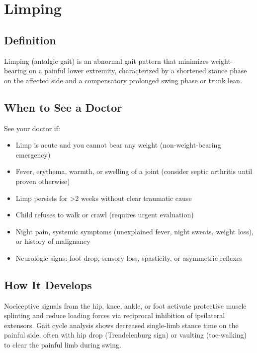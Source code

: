 \chapter{Limping}

\section*{Definition}
Limping (antalgic gait) is an abnormal gait pattern that minimizes weight-bearing on a painful lower extremity, characterized by a shortened stance phase on the affected side and a compensatory prolonged swing phase or trunk lean.

\section*{When to See a Doctor}
See your doctor if:
\begin{itemize}
  \item Limp is acute and you cannot bear any weight (non-weight-bearing emergency)
  \item Fever, erythema, warmth, or swelling of a joint (consider septic arthritis until proven otherwise)
  \item Limp persists for \textgreater{}2 weeks without clear traumatic cause
  \item Child refuses to walk or crawl (requires urgent evaluation)
  \item Night pain, systemic symptoms (unexplained fever, night sweats, weight loss), or history of malignancy
  \item Neurologic signs: foot drop, sensory loss, spasticity, or asymmetric reflexes
\end{itemize}

\section*{How It Develops}
Nociceptive signals from the hip, knee, ankle, or foot activate protective muscle splinting and reduce loading forces via reciprocal inhibition of ipsilateral extensors. Gait cycle analysis shows decreased single-limb stance time on the painful side, often with hip drop (Trendelenburg sign) or vaulting (toe-walking) to clear the painful limb during swing.

